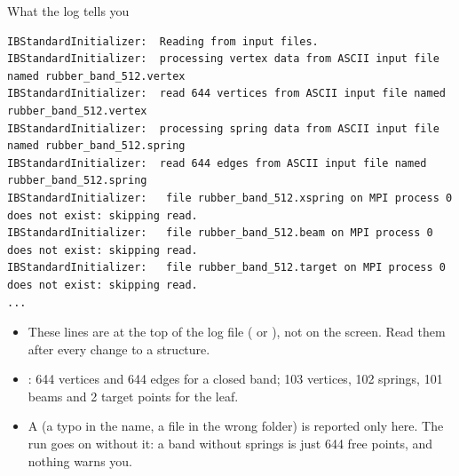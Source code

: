 \documentclass[aspectratio=169,11pt]{beamer}
\begin{document}
\begin{frame}[fragile]{What the log tells you}
\begin{lstlisting}[style=tiny]
IBStandardInitializer:  Reading from input files.
IBStandardInitializer:  processing vertex data from ASCII input file named rubber_band_512.vertex
IBStandardInitializer:  read 644 vertices from ASCII input file named rubber_band_512.vertex
IBStandardInitializer:  processing spring data from ASCII input file named rubber_band_512.spring
IBStandardInitializer:  read 644 edges from ASCII input file named rubber_band_512.spring
IBStandardInitializer:   file rubber_band_512.xspring on MPI process 0 does not exist: skipping read.
IBStandardInitializer:   file rubber_band_512.beam on MPI process 0 does not exist: skipping read.
IBStandardInitializer:   file rubber_band_512.target on MPI process 0 does not exist: skipping read.
...
\end{lstlisting}
\begin{itemize}
  \item These lines are at the top of the log file ( or ), not on the screen. Read them after every change to a structure.
  \item {}: 644 vertices and 644 edges for a closed band; 103 vertices, 102 springs, 101 beams and 2 target points for the leaf.
  \item A  (a typo in the name, a file in the wrong folder) is reported only here. The run goes on without it: a band without springs is just 644 free points, and nothing warns you.
\end{itemize}
\end{frame}
\end{document}
